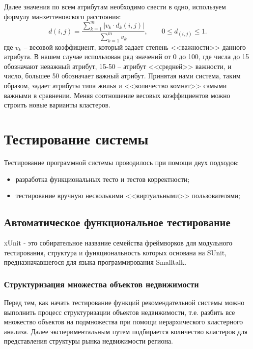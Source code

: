 \documentclass[a4paper,14pt,openany,final]{extreport} %
\begin{document}
Далее значения по всем атрибутам необходимо свести в одно, используем формулу манхеттеновского расстояния:
\[
  d(i,j)=\frac{\sum\limits_{k=1}^m|v_k\cdot d_k(i,j)|}{\sum\limits_{k=1}^m v_k}, \qquad 0\leqslant d_(i,j)\leqslant 1.
\]
где $v_k$ -- весовой коэффициент, который задает степень <<важности>> данного атрибута. В нашем случае использован ряд значений от 0 до 100, где числа до 15 обозначают неважный атрибут, 15-50 -- атрибут <<средней>> важности, и число, большее 50 обозначает важный атрибут. Принятая нами система, таким образом, задает атрибуты типа жилья и <<количество комнат>> самыми важными в сравнении. Меняя соотношение весовых коэффициентов можно строить новые варианты кластеров.

\section{Тестирование системы}
Тестирование программной системы проводилось при помощи двух подходов:
\begin{itemize}
\item разработка функциональных тесто и тестов корректности;
\item тестирование вручную несколькими <<виртуальными>> пользователями;
\end{itemize}

\subsection{Автоматическое функциональное тестирование}
xUnit - это собирательное название семейства фреймворков для модульного тестирования, структура и функциональность которых основана на SUnit, предназначавшегося для языка программирования Smalltalk.

\subsubsection{Структуризация множества объектов недвижимости}
Перед тем, как начать тестирование функций рекомендательной системы можно выполнить процесс структуризации объектов недвижимости, т.е. разбить все множество объектов на подмножества при помощи иерархического кластерного анализа. Далее экспериментальным путем подбирается количество кластеров для представления структуры рынка недвижимости региона.
\end{document}
